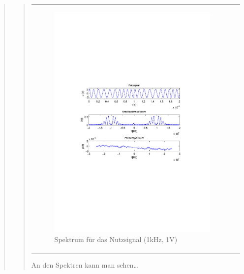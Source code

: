 \begin{quote}
\begin{quote}
\begin{center}
\begin{tabular}{ll}
\begin{minipage}{0.6\textwidth}
                     \begin{figure}[H]
                        \label{fig:}
                        \includegraphics[scale=0.5, trim = 2cm 6.5cm 1.5cm
                        8.5cm, clip]{./Bilder/spektrum_sin1kHz}
                        \caption{Spektrum für das Nutzsignal (1kHz, 1V)}
                    \end{figure}
               \vspace{-1.5em}

                \end{minipage}

            \end{tabular}
            \end{center}
        
        An den Spektren kann man sehen\ldots
        

\end{quote}
\end{quote}
